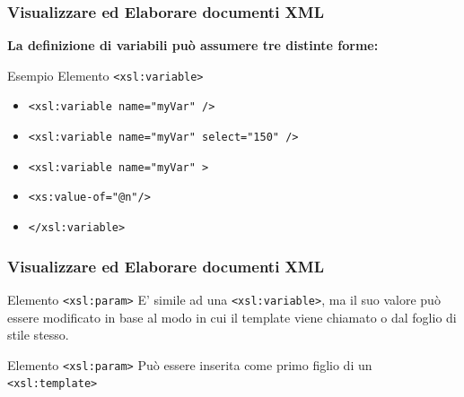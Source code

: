 \begin{frame}
    \frametitle{Visualizzare ed Elaborare documenti XML}
    \addtocounter{nframe}{1}
    
    \textbf{La definizione di variabili può assumere tre distinte forme:}

     \begin{block}{Esempio Elemento \texttt{<xsl:variable>}}
        \begin{itemize}
            \item \texttt{<xsl:variable name="myVar" />}
            \item \texttt{<xsl:variable name="myVar" select="150" />}
            \item \texttt{<xsl:variable name="myVar" >}
            \item[] \texttt{<xs:value-of="@n"/>}
            \item[] \texttt{</xsl:variable>}
        \end{itemize}

     \end{block}
\end{frame}


\begin{frame}
    \frametitle{Visualizzare ed Elaborare documenti XML}
    \addtocounter{nframe}{1}
    

     \begin{block}{Elemento \texttt{<xsl:param>}}
        E' simile ad una \texttt{<xsl:variable>}, ma il suo valore può essere modificato in base al modo in cui il template viene chiamato o dal foglio di stile stesso.
     \end{block}

     \begin{block}{Elemento \texttt{<xsl:param>}}
        Può essere inserita come primo figlio di un \texttt{<xsl:template>}
     \end{block}

\end{frame}

